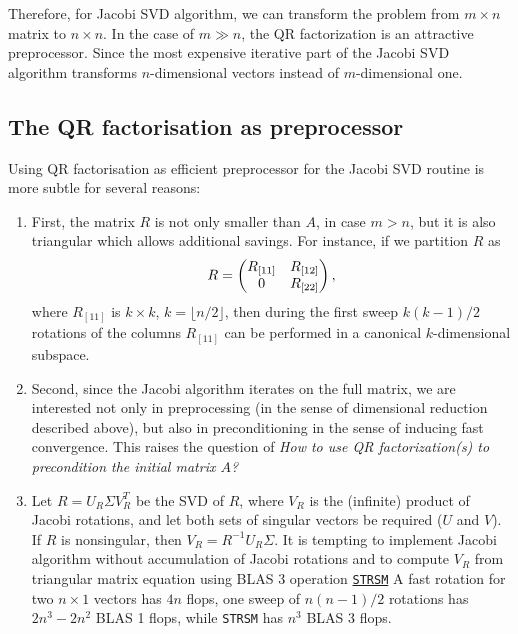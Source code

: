 \documentclass{article}
\begin{document}
Therefore, for Jacobi SVD algorithm, we can transform the problem from $m\times
n$ matrix to $n\times n$. In the case of $m\gg n$, the QR factorization is an
attractive preprocessor. Since the most expensive iterative part of the
Jacobi SVD algorithm transforms $n$-dimensional vectors instead of
$m$-dimensional one.

\subsection{The QR factorisation as preprocessor}
Using QR factorisation as efficient preprocessor for the Jacobi SVD routine
is more subtle for several reasons:
\begin{enumerate}
  \item First, the matrix $R$ is not only smaller than $A$, in case $m >
    n$, but it is also triangular which allows additional savings. For
    instance, if we partition $R$ as 
    \begin{equation}\notag
      R =
      \begin{pmatrix}
        R_{[11]} & R_{[12]}\\ 0 & R_{[22]}
      \end{pmatrix},
    \end{equation}
    where $R_{[11]}$ is $k\times k$, $k = \lfloor n/2 \rfloor$, then during
    the first sweep $k(k-1)/2$ rotations of the columns $R_{[11]}$ can be
    performed in a canonical $k$-dimensional subspace.
  \item Second, since the Jacobi algorithm iterates on the full matrix, we
    are interested not only in preprocessing (in the sense of dimensional
    reduction described above), but also in preconditioning in the sense of
    inducing fast convergence. This raises the question of \emph{How to
      use QR factorization(s) to precondition the initial matrix $A$?}
  \item Let $R = U_R\Sigma V_R^T$ be the SVD of $R$, where $V_R$ is the
    (infinite) product of Jacobi rotations, and let both sets of singular
    vectors be required ($U$ and $V$). If $R$ is nonsingular, then $V_R =
    R^{-1}U_R\Sigma$. It is tempting to implement Jacobi algorithm without
    accumulation of Jacobi rotations and to compute $V_R$ from triangular
    matrix equation using BLAS 3 operation
    \href{https://netlib.org/lapack/explore-html/db/dc9/group__single__blas__level3_ga9893cceb3ffc7ce400eee405970191b3.html}
    {\texttt{STRSM}}
    A fast rotation for two $n\times 1$ vectors has $4n$ flops, one sweep of
    $n(n-1)/2$ rotations has $2n^3 - 2n^2$ BLAS 1 flops, while
    \texttt{STRSM} has $n^3$ BLAS 3 flops. 
\end{enumerate}
\end{document}
